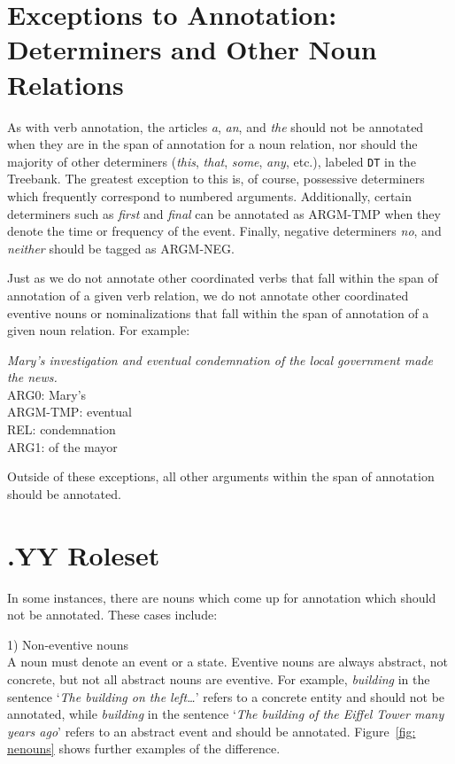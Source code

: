 \documentclass[11pt]{report}
\begin{document}
\section{Exceptions to Annotation: Determiners and Other Noun Relations}
As with verb annotation, the articles \textit{a}, \textit{an}, and \textit{the} should not be annotated when they are in the span of annotation for a noun relation, nor should the majority of other determiners (\textit{this}, \textit{that}, \textit{some}, \textit{any}, etc.), labeled \texttt{DT} in the Treebank.  The greatest exception to this is, of course, possessive determiners which frequently correspond to numbered arguments.  Additionally, certain determiners such as \textit{first} and \textit{final} can be annotated as ARGM-TMP when they denote the time or frequency of the event.  Finally, negative determiners \textit{no}, and \textit{neither} should be tagged as ARGM-NEG.  

Just as we do not annotate other coordinated verbs that fall within the span of annotation of a given verb relation, we do not annotate other coordinated eventive nouns or nominalizations that fall within the span of annotation of a given noun relation.  For example:

\textit{Mary's investigation and eventual condemnation of the local government made the news.}\\
ARG0: Mary's\\
ARGM-TMP: eventual\\
REL: condemnation\\
ARG1: of the mayor

Outside of these exceptions, all other arguments within the span of annotation should be annotated.  

\section{.YY Roleset}
\label{sec: YYrole}

In some instances, there are nouns which come up for annotation which should not be annotated. These cases include:\par
1) Non-eventive nouns \\
\hspace*{10 mm} A noun must denote an event or a state. Eventive nouns are always abstract, not concrete, but not all abstract nouns are eventive. For example, \textit{building} in the sentence `\textit{The building on the left\ldots}' refers to a concrete entity and should not be annotated, while \textit{building} in the sentence `\textit{The building of the Eiffel Tower many years ago}' refers to an abstract event and should be annotated. Figure~\ref{fig: nenouns} shows further examples of the difference. \par
\end{document}
